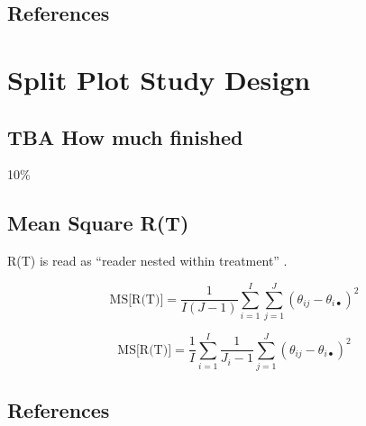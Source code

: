\documentclass[
]{book}
\begin{document}
\hypertarget{classification-tasks--references}{%
\section{References}\label{classification-tasks--references}}

\hypertarget{SplitPlotChapter}{%
\chapter{Split Plot Study Design}\label{SplitPlotChapter}}

\hypertarget{SplitPlotChapter-how-much-finished}{%
\section{TBA How much finished}\label{SplitPlotChapter-how-much-finished}}

10\%

\hypertarget{mean-square-rt}{%
\section{Mean Square R(T)}\label{mean-square-rt}}

R(T) is read as ``reader nested within treatment'' \citep{RN2508}.

\begin{equation}
\text{MS[R(T)]}=\frac{1}{I(J-1)}\sum_{i=1}^{I}\sum_{j=1}^{J}\left ( \theta_{ij} - \theta_{i\bullet} \right )^{2}
\label{eq:MSR-T-Hillis}
\end{equation}

\begin{equation}
\text{MS[R(T)]}=\frac{1}{I}\sum_{i=1}^{I}\frac{1}{J_i-1}\sum_{j=1}^{J}\left ( \theta_{ij} - \theta_{i\bullet} \right )^{2}
\label{eq:MSR-T-Hillis-Modified}
\end{equation}

\hypertarget{SplitPlotChapter-references}{%
\section{References}\label{SplitPlotChapter-references}}

  
\end{document}
